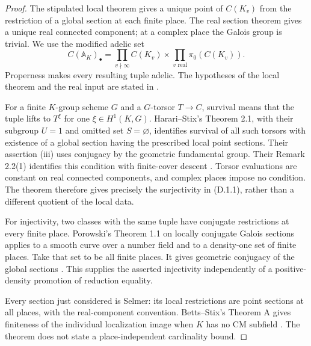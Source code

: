 \begin{proof}
The stipulated local theorem gives a unique point of $C(K_v)$
from the restriction of a global section at each finite place.
The real section theorem gives a unique real connected component;
at a complex place the Galois group is trivial. We use the
modified adelic set
\[
 C(\mathbb A_K)_\bullet=
 \prod_{v\nmid\infty}C(K_v)\times
 \prod_{v\text{ real}}\pi_0(C(K_v)).
\]
Properness makes every resulting tuple adelic. The hypotheses of
the local theorem and the real input are stated in
\cite[Theorem 1.1 and \S8]{AgentOpenAILocal}.

For a finite $K$-group scheme $G$ and a $G$-torsor $T\to C$,
survival means that the tuple lifts to $T^\xi$ for one
$\xi\in H^1(K,G)$. Harari--Stix's Theorem 2.1, with their
subgroup $U=1$ and omitted set $S=\varnothing$, identifies survival
of all such torsors with existence of a global section having the
prescribed local point sections. Their assertion (iii) uses
conjugacy by the geometric fundamental group. Their Remark 2.2(1)
identifies this condition with finite-cover descent
\cite[preprint Theorem 2.1, (i)$\Leftrightarrow$(iii), and
Remark 2.2(1)]{AgentHarariStix}. Torsor evaluations are constant
on real connected components, and complex places impose no
condition. The theorem therefore gives precisely the surjectivity
in (D.1.1), rather than a different quotient of the local data.

For injectivity, two classes with the same tuple have conjugate
restrictions at every finite place. Porowski's Theorem 1.1 on
locally conjugate Galois sections applies to a smooth curve over
a number field and to a density-one set of finite places. Take
that set to be all finite places. It gives geometric conjugacy of
the global sections \cite[Theorem 1.1]{AgentPorowskiConjugacy}.
This supplies the asserted injectivity independently of a
positive-density promotion of reduction equality.

Every section just considered is Selmer: its local restrictions
are point sections at all places, with the real-component
convention. Betts--Stix's Theorem A gives finiteness of the
individual localization image when $K$ has no CM subfield
\cite[Definition 1.1 and Theorem A]{AgentBettsStix}. The theorem
does not state a place-independent cardinality bound.
\end{proof}

